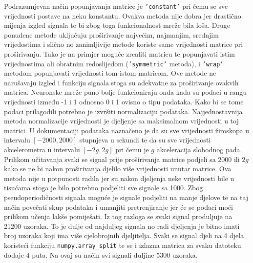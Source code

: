 \documentclass[times, utf8, diplomski]{fer}
\begin{document}
Podrazumjevan način popunjavanja matrice je \texttt{'constant'} pri čemu se sve vrijednosti postave na
neku konstantu. Ovakva metoda nije dobra jer drastično mijenja izgled signala te bi zbog toga funkcionalnost
mreže bila loša. Druge ponuđene metode uključuju proširivanje najvećim, najmanjim, srednjim vrijedostima i
slično no zanimljivije metode koriste same vrijednosti matrice pri proširivanju. Tako je na primjer
moguče zrcaliti matricu te popunjavati istim vrijednostima ali obratnim redoslijedom (\texttt{'symmetric'} metoda),
i \texttt{'wrap'} metodom popunjavati vrijednosti tom istom matricom. Ove metode ne narušavaju izgled i funkciju signala
stoga su adekvatne za proširivanje ovakvih matrica. Neuronske mreže puno bolje funkcioniraju onda kada su podaci u
rangu vrijednosti između -1 i 1 odnosno 0 i 1 ovisno o tipu podataka. Kako bi se tome podaci prilagodili potrebno
je izvršiti normalizaciju podataka. Najjednostavnija metoda normalizacije vrijednosti je djeljenje sa maksimalnom
vrijednosti u toj matrici. U dokumentaciji podataka naznačeno je da su sve vrijednosti žiroskopa u intervalu
$[-2000, 2000]$ stupnjeva u sekundi te da su sve vrijednosti akcelerometra u intervalu $[-2g, 2g]$ pri čemu je 
$g$ akceleracija slobodnog pada. Prilikom učitavanja svaki se signal prije proširivanja matrice podjeli sa
2000 ili $2g$ kako se ne bi nakon proširivanja djelilo više vrijednosti unutar matrice. Ova metoda nije u potpunosti
radila jer su nakon djeljenja neke vrijednosti bile u tisućama stoga je bilo potrebno podjeliti sve signale sa
1000. Zbog pseudoperiodičnosti signala moguće je signale podjeliti na manje djelove te na taj način povečati skup
podataka i umanjiti pretrenjiranje jer će se podaci moći prilikom učenja lakše pomiješati. Iz tog razloga se svaki
signal produljuje na 21200 uzoraka. To je dulje od najduljeg signala no radi djeljenja je bitno imati broj uzoraka
koji ima više cjelobrojnih djeljitelja. Svaki se signal djeli na 4 djela koristeći funkciju \texttt{numpy.array\_split}
te se i izlazna matrica za svaku datoteku dodaje 4 puta. Na ovaj su način svi signali duljine 5300 uzoraka. 
\end{document}
